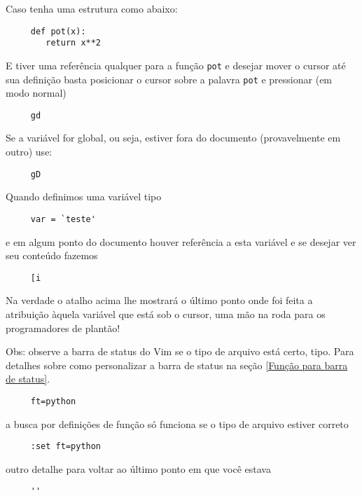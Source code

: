 Caso tenha uma estrutura como abaixo:

\begin{verbatim}
     def pot(x):
        return x**2
\end{verbatim}

E tiver uma referência qualquer para a função \verb+pot+ e desejar
mover o cursor até sua definição basta posicionar o cursor sobre a palavra
\verb+pot+ e pressionar (em modo normal)

\begin{verbatim}
     gd
\end{verbatim}

Se a variável for global, ou seja, estiver fora do documento
(provavelmente em outro) use:

\begin{verbatim}
     gD
\end{verbatim}

Quando definimos uma variável tipo

\begin{verbatim}
     var = `teste'
\end{verbatim}

e em algum ponto do documento houver referência a esta variável e se
desejar ver seu conteúdo fazemos

\begin{verbatim}
     [i
\end{verbatim}
Na verdade o atalho acima lhe mostrará o último ponto onde foi feita
a atribuição àquela variável que está sob o cursor, uma mão na roda
para os programadores de plantão!


Obs: observe a  barra de status do Vim se o tipo de arquivo está certo,
tipo. Para detalhes sobre como personalizar a barra de status na seção
\ref{Função para barra de status}.

\begin{verbatim}
     ft=python
\end{verbatim}

a busca por definições de função só funciona se o tipo de arquivo
estiver correto

\begin{verbatim}
     :set ft=python
\end{verbatim}

outro detalhe para voltar ao último ponto em que você estava

\begin{verbatim}
     ''
\end{verbatim}

